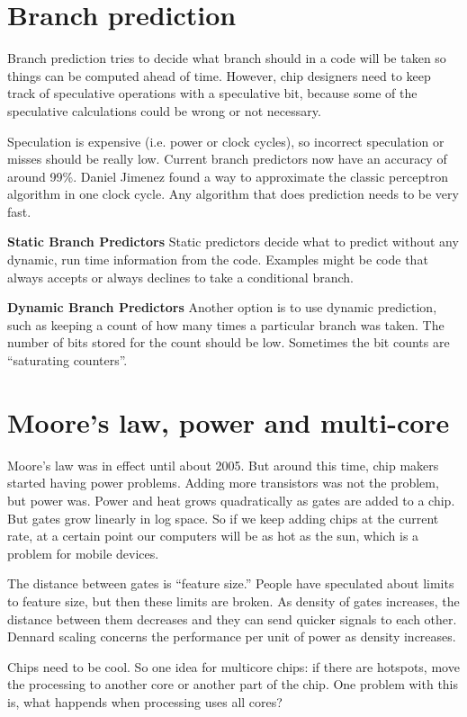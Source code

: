 \documentclass[twoside]{article}
\begin{document}
\section*{Branch prediction}
Branch prediction tries to decide what branch should in a code will be taken so things can be computed ahead of time. However, chip designers need to keep track of speculative operations with a speculative bit, because some of the speculative calculations could be wrong or not necessary.

Speculation is expensive (i.e. power or clock cycles), so incorrect speculation or misses should be really low. Current branch predictors now have an accuracy of around 99\%. Daniel Jimenez found a way to approximate the classic perceptron algorithm in one clock cycle. Any algorithm that does prediction needs to be very fast.


\textbf{Static Branch Predictors}
Static predictors decide what to predict without any dynamic, run time information from the code. Examples might be code that always accepts or always declines to take a conditional branch.

\textbf{Dynamic Branch Predictors}
Another option is to use dynamic prediction, such as keeping a count of how many times a particular branch was taken. The number of bits stored for the count should be low. Sometimes the bit counts are ``saturating counters''.

\section*{Moore's law, power and multi-core}

Moore's law was in effect until about 2005. But around this time, chip makers started having power problems. Adding more transistors was not the problem, but power was. Power and heat grows quadratically as gates are added to a chip. But gates grow linearly in log space. 
So if we keep adding chips at the current rate, at a certain point our computers will be as hot as the sun, which is a problem for mobile devices.

The distance between gates is ``feature size.'' People have speculated about limits to feature size, but then these limits are broken. As density of gates increases, the distance between them decreases and they can send quicker signals to each other. Dennard scaling concerns the performance per unit of power as density increases.

Chips need to be cool. So one idea for multicore chips: if there are hotspots, move the processing to another core or another part of the chip. One problem with this is, what happends when processing uses all cores?
\end{document}
